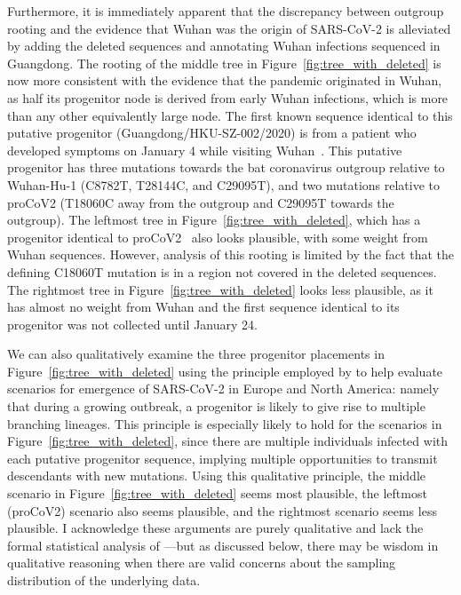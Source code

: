 \documentclass[9pt,twocolumn,twoside]{gsajnl_modified}
\begin{document}
Furthermore, it is immediately apparent that the discrepancy between outgroup rooting and the evidence that Wuhan was the origin of SARS-CoV-2 is alleviated by adding the deleted sequences and annotating Wuhan infections sequenced in Guangdong.
The rooting of the middle tree in Figure~\ref{fig:tree_with_deleted} is now more consistent with the evidence that the pandemic originated in Wuhan, as half its progenitor node is derived from early Wuhan infections, which is more than any other equivalently large node.
The first known sequence identical to this putative progenitor (Guangdong/HKU-SZ-002/2020) is from a patient who developed symptoms on January 4 while visiting Wuhan~\citep{chan2020familial}.
This putative progenitor has three mutations towards the bat coronavirus outgroup relative to Wuhan-Hu-1 (C8782T, T28144C, and C29095T), and two mutations relative to proCoV2 (T18060C away from the outgroup and C29095T towards the outgroup).
The leftmost tree in Figure~\ref{fig:tree_with_deleted}, which has a progenitor identical to proCoV2~\citep{kumar2021evolutionary} also looks plausible, with some weight from Wuhan sequences.
However, analysis of this rooting is limited by the fact that the defining C18060T mutation is in a region not covered in the deleted sequences.
The rightmost tree in Figure~\ref{fig:tree_with_deleted} looks less plausible, as it has almost no weight from Wuhan and the first sequence identical to its progenitor was not collected until January 24.

We can also qualitatively examine the three progenitor placements in Figure~\ref{fig:tree_with_deleted} using the principle employed by \citet{worobey2020emergence} to help evaluate scenarios for emergence of SARS-CoV-2 in Europe and North America: namely that during a growing outbreak, a progenitor is likely to give rise to multiple branching lineages.
This principle is especially likely to hold for the scenarios in Figure~\ref{fig:tree_with_deleted}, since there are multiple individuals infected with each putative progenitor sequence, implying multiple opportunities to transmit descendants with new mutations.
Using this qualitative principle, the middle scenario in Figure~\ref{fig:tree_with_deleted} seems most plausible, the leftmost (proCoV2) scenario also seems plausible, and the rightmost scenario seems less plausible.
I acknowledge these arguments are purely qualitative and lack the formal statistical analysis of \citet{worobey2020emergence}---but as discussed below, there may be wisdom in qualitative reasoning when there are valid concerns about the sampling distribution of the underlying data.
\end{document}
